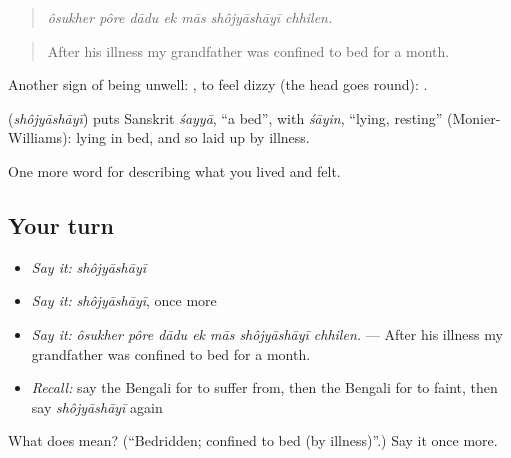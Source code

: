 \begin{quote}
\emph{ôsukher pôre dādu ek mās shôjyāshāyī chhilen.}
\end{quote}

\begin{quote}
After his illness my grandfather was confined to bed for a month.
\end{quote}

Another sign of being unwell:  , to feel dizzy (the head goes round):   .

\begin{cousinweb}
\textbf{} (\emph{shôjyāshāyī}) puts Sanskrit \emph{śayyā}, \textquotedblleft{}a bed\textquotedblright{}, with \emph{śāyin}, \textquotedblleft{}lying, resting\textquotedblright{} (Monier-Williams): lying in bed, and so laid up by illness.
\end{cousinweb}

\begin{grammarlens}[title={What you've built}]
One more word for describing what you lived and felt.
\end{grammarlens}

\subsection*{Your turn}
\begin{itemize}
\raggedright
  \item \emph{Say it:} \emph{shôjyāshāyī}
  \item \emph{Say it:} \emph{shôjyāshāyī}, once more
  \item \emph{Say it:} \emph{ôsukher pôre dādu ek mās shôjyāshāyī chhilen.} — After his illness my grandfather was confined to bed for a month.
  \item \emph{Recall:} say the Bengali for to suffer from, then the Bengali for to faint, then say \emph{shôjyāshāyī} again
\end{itemize}

\begin{tcolorbox}[breakable,colback=teal!4,colframe=teal!35!black,title={Before you move on}]
What does  mean? (\textquotedblleft{}Bedridden; confined to bed (by illness)\textquotedblright{}.) Say it once more.
\end{tcolorbox}
